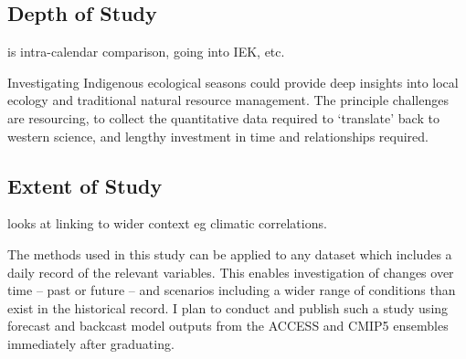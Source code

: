 \subsection{Depth of Study}
is intra-calendar comparison, going into IEK, etc.

Investigating Indigenous ecological seasons could provide deep insights
into local ecology and traditional natural resource management.
The principle challenges are resourcing, to collect the quantitative
data required to `translate' back to western science, and lengthy
investment in time and relationships required.



\subsection{Extent of Study}
looks at linking to wider context eg climatic correlations.

The methods used in this study can be applied to any dataset which
includes a daily record of the relevant variables.  This enables
investigation of changes over time -- past or future -- and scenarios
including a wider range of conditions than exist in the historical record.
I plan to conduct and publish such a study using forecast and backcast
model outputs from the ACCESS and CMIP5 ensembles immediately
after graduating.


